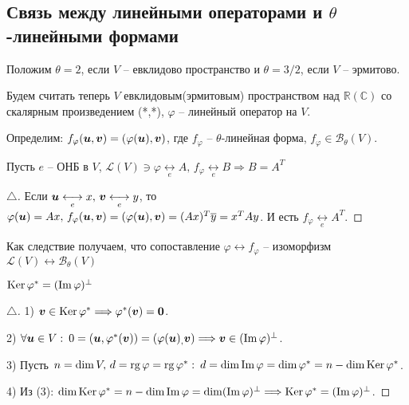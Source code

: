 \subsection{Связь между линейными операторами и $\theta$-линейными формами}

Положим $\theta = 2$, если $V$ -- евклидово пространство и $\theta=3/2$, если $V$ -- эрмитово.

Будем считать теперь $V$ евклидовым(эрмитовым) пространством над $\mathbb{R}(\mathbb{C})$ со скалярным произведением (*,*), $\varphi$ -- линейный оператор на $V$.

Определим: $f_\varphi (\mbox{\boldmath $u$}, \mbox{\boldmath $v$}) = (\varphi(\mbox{\boldmath $u$}), \mbox{\boldmath $v$})$, где $f_\varphi$ -- $\theta$-линейная форма, $f_\varphi \in \mathcal{B}_\theta (V)$.

\begin{to_lem} 
	 Пусть $e$ -- ОНБ в $V$, $\mathcal{L}(V) \ni \varphi \underset{e}{\longleftrightarrow} A, \, f_\varphi \underset{e}{\longleftrightarrow} B \Longrightarrow B = A^T$
\end{to_lem}

\begin{proof}[$\triangle$]
	Если $\mbox{\boldmath $u$} \underset{e}{\longleftrightarrow} x, \, \mbox{\boldmath $v$} \underset{e}{\longleftrightarrow} y$, то 
	$\varphi (\mbox{\boldmath $u$}) = A x, \, f_\varphi(\mbox{\boldmath $u$},\mbox{\boldmath $v$}) = (\varphi(\mbox{\boldmath $u$}),\mbox{\boldmath $v$}) = (A x)^T \overline{y} = x^T A y$. И есть $f_\varphi \underset{e}{\longleftrightarrow} A^T$.
\end{proof}

Как следствие получаем, что сопоставление $\varphi \longleftrightarrow f_\varphi$ -- изоморфизм $\mathcal{L}(V) \longleftrightarrow \mathcal{B}_\theta(V)$

\begin{to_thr} 
	 $\mathop{\mathrm{Ker}}\nolimits \varphi^* = (\mathop{\mathrm{Im}}\nolimits \varphi)^\bot$
\end{to_thr}

\begin{proof}[$\triangle$]
	1) $\mbox{\boldmath $v$} \in \mathop{\mathrm{Ker}}\nolimits \varphi^* \Longrightarrow \varphi^*(\mbox{\boldmath $v$}) = \mbox{\boldmath $0$}$.

	2) $\forall \mbox{\boldmath $u$} \in V: \: 0 = (\mbox{\boldmath $u$}, \varphi^*(\mbox{\boldmath $v$})) = (\varphi(\mbox{\boldmath $u$})_, \mbox{\boldmath $v$}) \Longrightarrow \mbox{\boldmath $v$} \in (\mathop{\mathrm{Im}}\nolimits \varphi)^\bot$.

	3) Пусть $n = \dim V, \, d = \mathop{\mathrm{rg}}\nolimits \varphi = \mathop{\mathrm{rg}}\nolimits \varphi^*: \: d = \dim \mathop{\mathrm{Im}}\nolimits \varphi = \dim \varphi^* = n - \dim \mathop{\mathrm{Ker}}\nolimits \varphi^*$.

	4) Из (3): $\dim \mathop{\mathrm{Ker}}\nolimits \varphi^* = n - \dim \mathop{\mathrm{Im}}\nolimits \varphi = \dim (\mathop{\mathrm{Im}}\nolimits \varphi)^\bot \Longrightarrow \mathop{\mathrm{Ker}}\nolimits \varphi^* = (\mathop{\mathrm{Im}}\nolimits \varphi)^\bot$. 
\end{proof}

